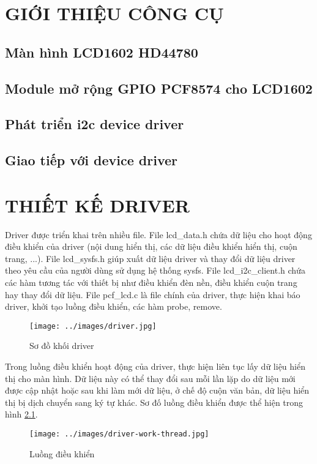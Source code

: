 \documentclass{report}
\begin{document}



\chapter{GIỚI THIỆU CÔNG CỤ}
\section{Màn hình LCD1602 HD44780}

\section{Module mở rộng GPIO PCF8574 cho LCD1602}


\section{Phát triển \acrshort{i2c} device driver}

\section {Giao tiếp với device driver}

\chapter{THIẾT KẾ DRIVER}

Driver được triển khai trên nhiều file. File lcd\_data.h chứa dữ liệu cho hoạt động điều khiển của driver (nội dung hiển thị, các dữ liệu điều khiển hiển thị, cuộn trang, ...).  File lcd\_sysfs.h giúp xuất dữ liệu driver và thay đổi dữ liệu driver theo yêu cầu của người dùng sử dụng hệ thống sysfs. File lcd\_i2c\_client.h chứa các hàm tương tác với thiết bị như điều khiển đèn nền, điều khiển cuộn trang hay thay đổi dữ liệu. File pcf\_lcd.c là file chính của driver, thực hiện khai báo driver, khởi tạo luồng điều khiển, các hàm probe, remove.

\begin{figure}[H]
	\centering
	\texttt{[image: ../images/driver.jpg]}
	\caption{Sơ đồ khối driver}
\end{figure}
Trong luồng điều khiển hoạt động của driver, thực hiện liên tục lấy dữ liệu hiển thị cho màn hình. Dữ liệu này có thể thay đổi sau mỗi lần lặp do dữ liệu mới được cập nhật hoặc sau khi làm mới dữ liệu, ở chế độ cuộn văn bản, dữ liệu hiển thị bị dịch chuyển sang ký tự khác. Sơ đố luồng điều khiển được thể hiện trong hình \ref{f:work-thread}.
\begin{figure}[H]
	\centering
	\texttt{[image: ../images/driver-work-thread.jpg]}
	\caption{Luồng điều khiển}
	\label{f:work-thread}
\end{figure}
\end{document}
